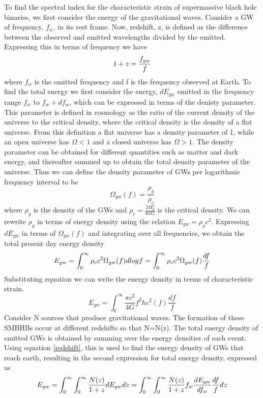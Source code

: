 \documentclass[12pt]{article}
\begin{document}
To find the spectral index for the characteristic strain of supermassive black hole binaries, we first consider the energy of the gravitational waves. Consider a GW of frequency, $f_w$, in its rest frame. Now, redshift, z, is defined as the difference between the observed and emitted wavelengths divided by the emitted. Expressing this in terms of frequency we have
\begin{equation}{\label{redshift}}
1+z=\frac{f_{gw}}{f}
\end{equation}
where $f_w$ is the emitted frequency and f is the frequency observed at Earth. To find the total energy we first consider the energy, $dE_{gw}$ emitted in the frequency range $f_w$ to $f_w + df_w$, which can be expressed in terms of the denisty parameter. This parameter is defined in cosmology as the ratio of the current density of the universe to the critical density, where the critical density is the density of a flat universe. From this definition a flat universe has a density parameter of 1, while an open universe has $\Omega<1$ and a closed universe has $\Omega>1$. The density parameter can be obtained for different quantities such as matter and dark energy, and thereafter summed up to obtain the total density parameter of the universe. Thus we can define the density parameter of GWs per logarithmic frequency interval to be
\begin{equation}
\Omega_{gw}(f)=\frac{\rho_g}{\rho_c}
\end{equation}
where $\rho_g$ is the density of the GWs and $\rho_c=\frac{3H_0^2}{8 \pi G}$ is the critical density. We can rewrite $\rho_g$ in terms of energy density using the relation $E_{gw}=\rho_g c^2$. Expressing $dE_{gw}$ in terms of $\Omega_{gw}(f)$ and integrating over all frequencies, we obtain the total present day energy density 
\begin{equation}{\label{total energy density of gws ito density parameter}}
E_{gw}=\int_{0}^{\infty}\rho_c c^2\Omega_{gw}(f)dlogf=\int_{0}^{\infty}\rho_c c^2\Omega_{gw}(f)\frac{df}{f}
\end{equation}
Substituting equation we can write the energy density in terms of characteristic strain.
\begin{equation}
E_{gw}=\int_{0}^{\infty}\frac{\pi c^2}{4G}f^2hc^2(f)\frac{df}{f}
\end{equation}
Consider N sources that produce gravitational waves. The formation of these SMBHBs occur at different redshifts so that N=N(z). The total energy density of emitted GWs is obtained by summing over the energy densities of each event. Using equation \ref{redshift}, this is used to find the energy density of GWs that reach earth, resulting in the second expression for total energy density, expressed as 
\begin{equation}{\label{second total energy eqn}}
E_{gw}=\int_{0}^{\infty} \int_{0}^{\infty}\frac{N(z)}{1+z}dE_{gw}dz=\int_{0}^{\infty} \int_{0}^{\infty}\frac{N(z)}{1+z}f_w\frac{dE_{gw}}{df_w}\frac{df}{f}dz
\end{equation}
\end{document}
